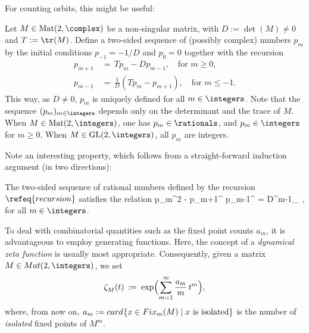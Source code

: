 {

For counting orbits, this
might be useful:

Let $M\in\mbox{Mat}(2,\complex)$ be a non-singular matrix, with $D:=\det(M)\neq
0$ and $T:=\tr(M)$. Define a two-sided sequence of (possibly
complex) numbers $p_m$ by the initial conditions $p^{}_{-1} = -1/D$
and $p^{}_{0}=0$ together with the recursion
\begin{equation} \label{recursion}
  \begin{split}
     p_{m+1} & \,  = \, T p_{m} - D p_{m-1} ,
      \quad \text{for $m\ge 0$,}   \\
     p_{m-1} & \,  = \, \frac{1}{D} (T p_{m} - p_{m+1}) ,
      \quad \text{for $m\le -1$.}
  \end{split}
\end{equation}
This way, as $D\neq 0$, $p_m$ is uniquely defined for all $m\in\integers$.
Note that the sequence $(p_m)_{m\in\integers}$ depends only on the
determinant and the trace of $M$. When $M\in\mbox{Mat}(2,\integers)$, one has
$p_m\in\rationals$, and $p_m\in\integers$ for $m\ge 0$. When $M\in\mbox{GL}(2,\integers)$, all
$p_m$ are integers.

Note an interesting property, which follows from a
straight-forward induction argument (in two directions):

  The two-sided sequence of rational numbers defined
  by the recursion $\refeq{recursion}$ satisfies the
  relation
\beq
p_{m}^{2} - p_{m+1}^{} p_{m-1}^{} = D^{m-1}_{}
\,,
  for all $m\in\integers$.  %

To deal with combinatorial quantities such as the fixed point counts
$a_m$, it is advantageous to employ generating functions.
Here, the concept of a
\emph{dynamical zeta function} is usually most
appropriate.  Consequently, given a matrix $M\in{Mat} (2,\integers)$, we set
\begin{equation} \label{define-zeta}
   \zeta^{}_{M} (t) \, := \; \exp\Bigl( \sum_{m = 1}^{\infty}
        \frac{a_m}{m}\, t^m \Bigr),
\end{equation}
where, from now on, $a_m := {card{\hspace{0.5pt}}} \{ x\in{Fix}_m (M)\mid x \text{ is
isolated} \}$ is the number of \emph{isolated} fixed points of $M^m$.

}
